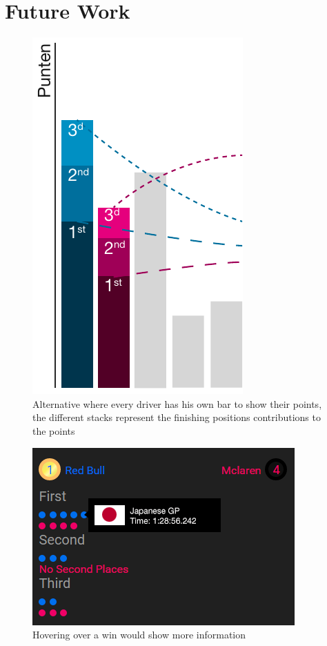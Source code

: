 \documentclass{sigchi}
\begin{document}
\section{Future Work} 
\begin{figure}[ht]
  \centering
  \includegraphics[width=0.5\columnwidth]{images/alternative.pdf}
  \caption{Alternative where every driver has his own bar to show their points,
  the different stacks represent the finishing positions contributions to the points}
  \label{fig:alternative}
\end{figure}

\begin{figure}[ht]
  \centering
  \includegraphics[width=1\columnwidth]{images/hovering.png}
  \caption{Hovering over a win would show more information}
  \label{fig:hover}
\end{figure}
\end{document}
